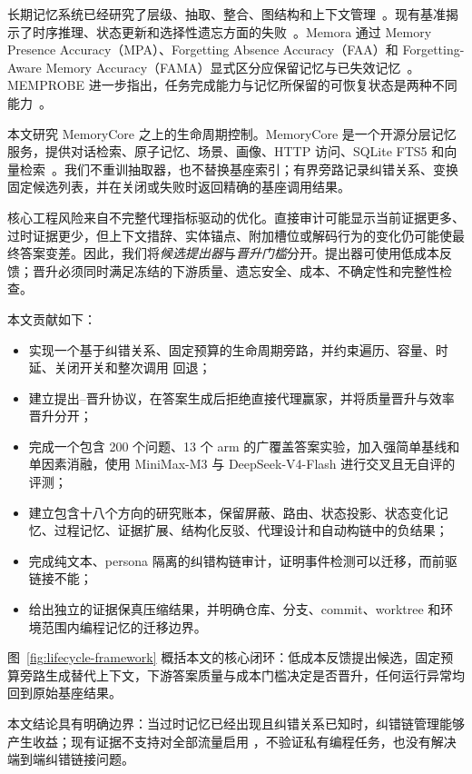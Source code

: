 长期记忆系统已经研究了层级、抽取、整合、图结构和上下文管理~\cite{packer2023memgpt,xu2025amem,chhikara2025mem0,rasmussen2025zep}。现有基准揭示了时序推理、状态更新和选择性遗忘方面的失败~\cite{maharana2024locomo,wu2024longmemeval,hu2026memoryagentbench}。Memora 通过 Memory Presence Accuracy（MPA）、Forgetting Absence Accuracy（FAA）和 Forgetting-Aware Memory Accuracy（FAMA）显式区分应保留记忆与已失效记忆~\cite{uddin2026memora}。MEMPROBE 进一步指出，任务完成能力与记忆所保留的可恢复状态是两种不同能力~\cite{ma2026memprobe}。

本文研究 MemoryCore 之上的生命周期控制。MemoryCore 是一个开源分层记忆服务，提供对话检索、原子记忆、场景、画像、HTTP 访问、SQLite FTS5 和向量检索~\cite{memorycore2026}。我们不重训抽取器，也不替换基座索引；有界旁路记录纠错关系、变换固定候选列表，并在关闭或失败时返回精确的基座调用结果。

核心工程风险来自不完整代理指标驱动的优化。直接审计可能显示当前证据更多、过时证据更少，但上下文措辞、实体锚点、附加槽位或解码行为的变化仍可能使最终答案变差。因此，我们将\emph{候选提出器}与\emph{晋升门槛}分开。提出器可使用低成本反馈；晋升必须同时满足冻结的下游质量、遗忘安全、成本、不确定性和完整性检查。

本文贡献如下：
\begin{itemize}
  \item 实现一个基于纠错关系、固定预算的生命周期旁路，并约束遍历、容量、时延、关闭开关和整次调用 \base 回退；
  \item 建立提出--晋升协议，在答案生成后拒绝直接代理赢家，并将质量晋升与效率晋升分开；
  \item 完成一个包含 200 个问题、13 个 arm 的广覆盖答案实验，加入强简单基线和单因素消融，使用 MiniMax-M3 与 DeepSeek-V4-Flash 进行交叉且无自评的评测；
  \item 建立包含十八个方向的研究账本，保留屏蔽、路由、状态投影、状态变化记忆、过程记忆、证据扩展、结构化反驳、代理设计和自动构链中的负结果；
  \item 完成纯文本、persona 隔离的纠错构链审计，证明事件检测可以迁移，而前驱链接不能；
  \item 给出独立的证据保真压缩结果，并明确仓库、分支、commit、worktree 和环境范围内编程记忆的迁移边界。
\end{itemize}

图~\ref{fig:lifecycle-framework} 概括本文的核心闭环：低成本反馈提出候选，固定预算旁路生成替代上下文，下游答案质量与成本门槛决定是否晋升，任何运行异常均回到原始基座结果。

\frameworkfigure

本文结论具有明确边界：当过时记忆已经出现且纠错关系已知时，纠错链管理能够产生收益；现有证据不支持对全部流量启用 \vone，不验证私有编程任务，也没有解决端到端纠错链接问题。

